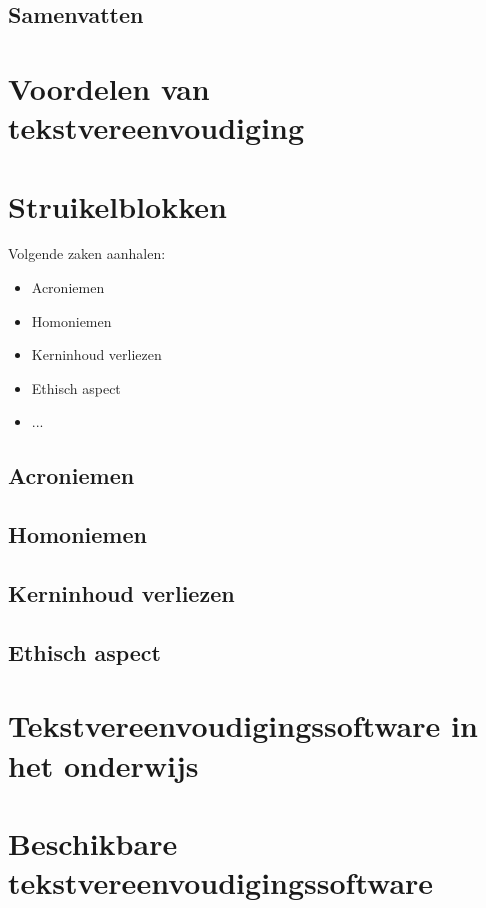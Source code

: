 \subsection{Samenvatten}



\section{Voordelen van tekstvereenvoudiging}

\section{Struikelblokken}

Volgende zaken aanhalen:
\begin{itemize}
	\item Acroniemen
	\item Homoniemen
	\item Kerninhoud verliezen
	\item Ethisch aspect
	\item ...
\end{itemize}

\subsection{Acroniemen}

\subsection{Homoniemen}

\subsection{Kerninhoud verliezen}

\subsection{Ethisch aspect}

\cite{Gooding2022}

\section{Tekstvereenvoudigingssoftware in het onderwijs}

\section{Beschikbare tekstvereenvoudigingssoftware}

